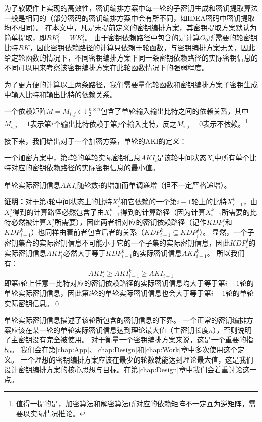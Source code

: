 为了软硬件上实现的高效性，密钥编排方案中每一轮的子密钥生成和密钥提取算法一般是相同的（部分密码的密钥编排方案中会有所不同，如IDEA密码中密钥提取均不相同）。
在本文中，凡是未提前定义的密钥编排方案，其密钥提取方案默认为简单提取，即$RK_i^j=WK_i^j$。
由于密钥依赖路径中包含的是计算$O_0$所需要的轮密钥比特$RK$，因此密钥依赖路径的计算只依赖于轮函数，与密钥编排方案无关，因此给定轮函数的情况下，不同密钥编排方案下同一条密钥依赖路径的实际密钥信息的不同可以用来考察该密钥编排方案在此轮函数情况下的强弱程度。

为了更方便的计算以上两条路径，我们需要量化轮函数和密钥编排方案子密钥生成中输入比特和输出比特的依赖关系。
\begin{defn}[依赖矩阵]
    一个依赖矩阵$M=M_{i,j}\in\mathbb{F}^{n\times n}_2$包含了单轮输入输出比特之间的依赖关系，其中$M_{i,j}=1$表示第$i$个输出比特依赖于第$j$个输入比特，反之$M_{i,j}=0$表示不依赖。\footnote{值得一提的是，加密算法和解密算法所对应的依赖矩阵不一定互为逆矩阵，需要以实际情况推论。}
\end{defn}

接下来，我们给出对于一个加密方案，单轮的AKI的定义：
\begin{defn}[单轮实际密钥信息]
    一个加密方案中，第$i$轮的单轮实际密钥信息$AKI_i$是该轮中间状态$X_i$中所有单个比特对应的密钥依赖路径的实际密钥信息的最小值。
    \label{def:RoundAKI}
\end{defn}
\begin{thm}
    单轮实际密钥信息$AKI_i$随轮数$i$的增加而单调递增（但不一定严格递增）。
\end{thm}
\noindent
\textbf{证明：}对于第$i$轮中间状态上的比特$X_i^j$和它依赖的一个第$i-1$轮上的比特$X_{i-1}^k$，由$X_i^j$得到的计算路径必然包含了由$X_{i-1}^k$得到的计算路径（因为计算$X_{i-1}^k$所需要的比特必然被计算$X_i^j$所需要），因此两者相对应的密钥依赖路径（记作$KDP_i^j$和$KDP_{i-1}^k$）也同样由着前者包含后者的关系（$KDP_{i-1}^k\subseteq KDP_i^j$）。
显然，一个子密钥集合的实际密钥信息不可能小于它的一个子集的实际密钥信息，因此$KDP_i^j$的实际密钥信息$AKI_i^j$必然大于等于$KDP_{i-1}^k$的实际密钥信息$AKI_{i-1}^k$。
所以我们有：
$$AKI_i^j\geq AKI_{i-1}^k\geq AKI_{i-1}$$
即第$i$轮上任意一比特对应的密钥依赖路径的实际密钥信息均大于等于第$i-1$轮的单轮实际密钥信息，因此第$i$轮的单轮实际密钥信息也会大于等于第$i-1$轮的单轮实际密钥信息。\qed

单轮实际密钥信息描述了该轮所包含的密钥信息的下界。
一个正常的密钥编排方案应该在某一轮的单轮实际密钥信息达到理论最大值（主密钥长度$n$），否则说明了主密钥没有完全被使用。
对于衡量一个密钥编排方案来说，这是一个重要的指标。
我们会在第\ref{chap:App}、\ref{chap:Design}和\ref{chap:Work}章中多次使用这个定义。
一个理想的密钥编排方案应该在最少的轮数就能达到理论最大值，这是我们设计密钥编排方案的核心思想与目标。在第\ref{chap:Design}章中我们会着重讨论这一点。

